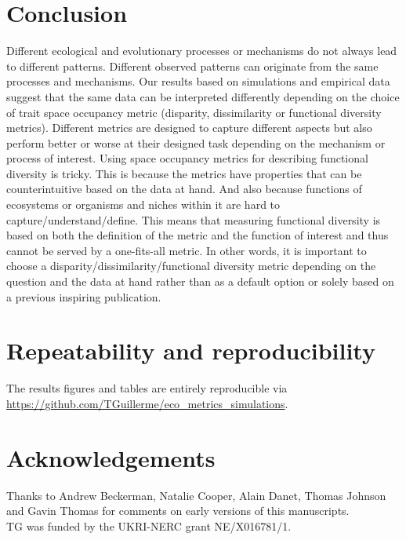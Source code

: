 \documentclass[12pt,letterpaper]{article}
\begin{document}
\section{Conclusion}
Different ecological and evolutionary processes or mechanisms do not always lead to different patterns.
Different observed patterns can originate from the same processes and mechanisms.
Our results based on simulations and empirical data suggest that the same data can be interpreted differently depending on the choice of trait space occupancy metric (disparity, dissimilarity or functional diversity metrics).
Different metrics are designed to capture different aspects \citep{guillerme2020shifting,mammola2021concepts} but also perform better or worse at their designed task depending on the mechanism or process of interest.
Using space occupancy metrics for describing functional diversity is tricky. This is because the metrics have properties that can be counterintuitive based on the data at hand. And also because functions of ecosystems or organisms and niches within it are hard to capture/understand/define. This means that measuring functional diversity is based on both the definition of the metric and the function of interest and thus cannot be served by a one-fits-all metric.
In other words, it is important to choose a disparity/dissimilarity/functional diversity metric depending on the question and the data at hand rather than as a default option or solely based on a previous inspiring publication.


\section{Repeatability and reproducibility}
The results figures and tables are entirely reproducible via \url{https://github.com/TGuillerme/eco_metrics_simulations}.


\section{Acknowledgements}
Thanks to Andrew Beckerman, Natalie Cooper, Alain Danet, Thomas Johnson and Gavin Thomas for comments on early versions of this manuscripts.\\
TG was funded by the UKRI-NERC grant NE/X016781/1.




\end{document}
